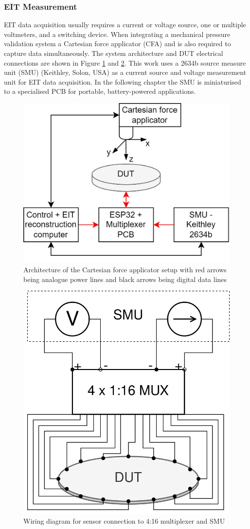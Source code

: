\subsubsection{EIT Measurement}\label{sec:EIT Measurement}
EIT data acquisition usually requires a current or voltage source, one or multiple voltmeters, and a switching device. When integrating a mechanical pressure validation system a Cartesian force applicator (CFA) and is also required to capture data simultaneously. The system architecture and DUT electrical connections are shown in Figure \ref{fig:eit_sensor_architecture} and \ref{fig:wiring_ERT_sensor}. This work uses a 2634b source measure unit (SMU) (Keithley, Solon, USA) as a current source and voltage measurement unit for EIT data acquisition. In the following chapter the SMU is miniaturised to a specialised PCB for portable, battery-powered applications.
\begin{figure}[H]
    \centering
    \includegraphics[width=0.6\linewidth]{Figures/ERT_MUX_CFA_architecture.jpg}
    \caption{Architecture of the Cartesian force applicator setup with red arrows being analogue power lines and black arrows being digital data lines}
    \label{fig:eit_sensor_architecture}
\end{figure}
\begin{figure}[H]
    \centering
    \includegraphics[width=0.35\linewidth]{Figures/wiring_diagram_ERT_sensor.jpg}
    \caption{Wiring diagram for sensor connection to 4:16 multiplexer and SMU}
    \label{fig:wiring_ERT_sensor}
\end{figure} 

